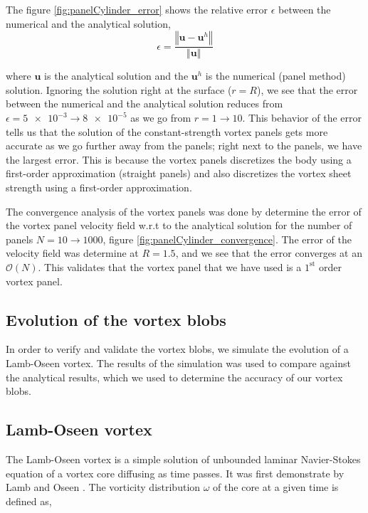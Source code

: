 The figure \ref{fig:panelCylinder_error} shows the relative error $\epsilon$ between the numerical and the analytical solution,
	\begin{equation}
	\epsilon = \frac{\left\Vert\mathbf{u}-\mathbf{u}^h\right\Vert}{\left\Vert\mathbf{u}\right\Vert}
	\label{eq:panelRelativeError}
	\end{equation}
	
where $\mathbf{u}$ is the analytical solution and the $\mathbf{u}^h$ is the numerical (panel method) solution. Ignoring the solution right at the surface ($r=R$), we see that the error between the numerical and the analytical solution reduces from $\epsilon=\num{5e-3}\rightarrow \num{8e-5}$ as we go from $r=1\rightarrow10$. This behavior of the error tells us that the solution of the constant-strength vortex panels gets more accurate as we go further away from the panels; right next to the panels, we have the largest error. This is because the vortex panels discretizes the body using a first-order approximation (straight panels) and also discretizes the vortex sheet strength using a first-order approximation. 

The convergence analysis of the vortex panels was done by determine the error of the vortex panel velocity field w.r.t to the analytical solution for the number of panels $N = 10 \rightarrow 1000$, figure \ref{fig:panelCylinder_convergence}. The error of the velocity field was determine at $R = 1.5$, and we see that the error converges at an $\mathcal{O}\left(N\right)$. This validates that the vortex panel that we have used is a $1^{\mathrm{st}}$ order vortex panel.

\subsection{Evolution of the vortex blobs}

In order to verify and validate the vortex blobs, we simulate the evolution of a Lamb-Oseen vortex. The results of the simulation was used to compare against the analytical results, which we used to determine the accuracy of our vortex blobs.

\subsection*{Lamb-Oseen vortex}
\label{subsec:lagrangianLambOseen}
The Lamb-Oseen vortex is a simple solution of unbounded laminar Navier-Stokes equation of a vortex core diffusing as time passes. It was first demonstrate by Lamb and Oseen \cite{Tryggeson2007}. The vorticity distribution $\omega$ of the core at a given time is defined as,

